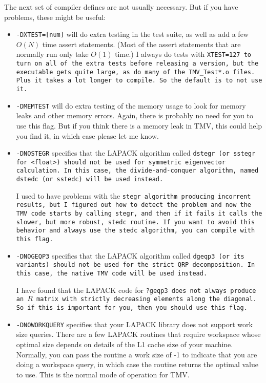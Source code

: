 The next set of compiler defines are not usually necessary.  But
if you have problems, these might be useful:
\begin{itemize}
\item
\texttt{-DXTEST=[num]} will do extra testing in the test suite, as well as add a few $O(N)$
time assert statements.  (Most of the assert statements that are normally run only take
$O(1)$ time.)  I always do tests with \tt{XTEST=127} to turn on all of the extra tests
before releasing a version, but the
executable gets quite large, as do many of the \texttt{TMV\_Test*.o} files.  Plus it takes
a lot longer to compile.  So the default is to not use it.  

\item
\texttt{-DMEMTEST} will do extra testing of the memory usage to look for memory leaks
and other memory errors.  Again, there is probably no need for you to use this
flag.  But if you think there is a memory leak in TMV, this could help you find it, 
in which case please let me know.

\item
\texttt{-DNOSTEGR} specifies that the LAPACK algorithm called
\tt{dstegr} (or \tt{sstegr} for \tt{<float>}) should not be used for symmetric
eigenvector calculation.  In this case, the divide-and-conquer algorithm,
named \tt{dstedc} (or \tt{sstedc}) will be used instead.

I used to have problems with the \tt{stegr} algorithm producing incorrent
results, but I figured out how to detect the problem and now
the TMV code starts by calling \tt{stegr}, and then if it fails it calls
the slower, but more robust, \tt{stedc} routine.
If you want to avoid this behavior and always use the \tt{stedc} algorithm,
you can compile with this flag.
\item
\texttt{-DNOGEQP3} specifies that the LAPACK algorithm called
\tt{dgeqp3} (or its variants) should not be used for the strict QRP decomposition.
In this case, the native TMV code will be used instead.

I have found that the LAPACK code for \tt{?geqp3} does not always
produce an $R$ matrix
with strictly decreasing elements along the diagonal.  So if this is important
for you, then you should use this flag.
\item
{}
\texttt{-DNOWORKQUERY} specifies that your LAPACK library does not support
work size queries.  There are a few LAPACK routines that require workspace whose
optimal size depends on details of the L1 cache size of your machine.  Normally,
you can pass the routine a work size of -1 to indicate that you are doing a workspace
query, in which case the routine returns the optimal value to use.  This is the normal
mode of operation for TMV.  


\end{itemize}

